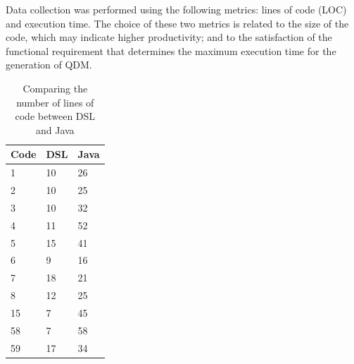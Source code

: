 Data collection was performed using the following metrics: lines of code (LOC) and execution time. The choice of these two metrics is related to the size of the code, which may indicate higher productivity; and to the satisfaction of the functional requirement that determines the maximum execution time for the generation of QDM.


\begin{table}[htb!]
\centering
\caption{Comparing the number of lines of code between DSL and Java}
\label{table:comparacao}
\begin{center}
\begin{tabular}{lll}
\toprule
\textbf{Code} & \textbf{DSL} & \textbf{Java}     \\ \midrule
1        & 10  & 26   \\ %
2        & 10  & 25   \\ %
3        & 10  & 32   \\ %
4        & 11  & 52   \\ %
5        & 15  & 41   \\ %
6        & 9   & 16   \\ %
7        & 18  & 21   \\ %
8        & 12  & 25   \\ %
15       & 7   & 45   \\ %
58       & 7   & 58   \\ %
59       & 17  & 34   \\ \bottomrule
\end{tabular}
\end{center}
\end{table}


